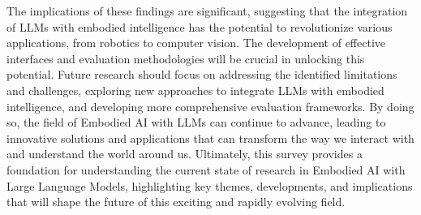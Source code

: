 \documentclass[conference]{IEEEtran}
\begin{document}
The implications of these findings are significant, suggesting that the integration of LLMs with embodied intelligence has the potential to revolutionize various applications, from robotics to computer vision. The development of effective interfaces and evaluation methodologies will be crucial in unlocking this potential. Future research should focus on addressing the identified limitations and challenges, exploring new approaches to integrate LLMs with embodied intelligence, and developing more comprehensive evaluation frameworks. By doing so, the field of Embodied AI with LLMs can continue to advance, leading to innovative solutions and applications that can transform the way we interact with and understand the world around us. Ultimately, this survey provides a foundation for understanding the current state of research in Embodied AI with Large Language Models, highlighting key themes, developments, and implications that will shape the future of this exciting and rapidly evolving field.
\end{document}

